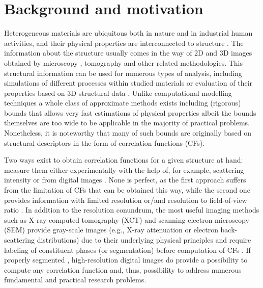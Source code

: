 \documentclass[1p]{elsarticle}
\begin{document}
\section{Background and motivation}
\label{sec:background}
Heterogeneous materials are ubiquitous both in nature and in industrial human
activities, and their physical properties are interconnected to structure
\cite{Torquato_book,Sahimi_book}. The information about the structure usually
comes in the way of 2D and 3D images obtained by microscopy
\cite{moussaoui2018,neumann2019,FIB-SEMpaper}, tomography \cite{xctmat_book} and
other related methodologies.  This structural information can be used for
numerous types of analysis, including simulations of different processes within
studied materials or evaluation of their properties based on 3D structural data
\cite{youssef2005,Miao2017,FDMSS}. Unlike computational modelling techniques a
whole class of approximate methods exists including (rigorous) bounds that
allows very fast estimations of physical properties
\cite{eshelby1957,berryman1986use,rozanski2023} albeit the bounds themselves are
too wide to be applicable in the majority of practical problems. Nonetheless, it
is noteworthy that many of such bounds are originally based on structural
descriptors in the form of correlation functions (CFs).

Two ways exist to obtain correlation functions for a given structure at hand:
measure them either experimentally with the help of, for example, scattering
intensity \cite{debye1957scattering,li2018direct} or from digital images
\cite{berryman1985measurement,ma2018SS}. None is perfect, as the first approach
suffers from the limitation of CFs that can be obtained this way, while the
second one provides information with limited resolution or/and resolution to
field-of-view ratio \cite{gerke2015universal}. In addition to the resolution
conundrum, the most useful imaging methods such as X-ray computed tomography
(XCT) and scanning electron microscopy (SEM) provide gray-scale images (e.g.,
X-ray attenuation or electron back-scattering distributions) due to their
underlying physical principles and require labeling of constituent phases (or
segmentation) before computation of CFs \cite{samarin2023robust}. If properly
segmented \cite{NNseg}, high-resolution digital images do provide a possibility
to compute any correlation function and, thus, possibility to address numerous
fundamental and practical research problems.
\end{document}
